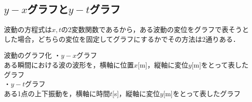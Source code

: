 \subsection{$y-x$グラフと$y-t$グラフ}
波動の方程式は$x,t$の2変数関数であるから，ある波動の変位をグラフで表そうとした場合，どちらの変位を固定してグラフにするかでその方法は2通りある．
\begin{matome}{波動のグラフ化}
 \hspace{3mm} $・y-xグラフ$\\
  \hspace{5mm} ある瞬間における波の波形を，横軸に位置$x$[m]，縦軸に変位$y$[m]をとって表したグラフ\\
 \hspace{3mm} $・y-tグラフ$\\
  \hspace{5mm} ある1点の上下振動を，横軸に時間$t$[s]，縦軸に変位$y$[m]をとって表したグラフ
 \end{matome}

